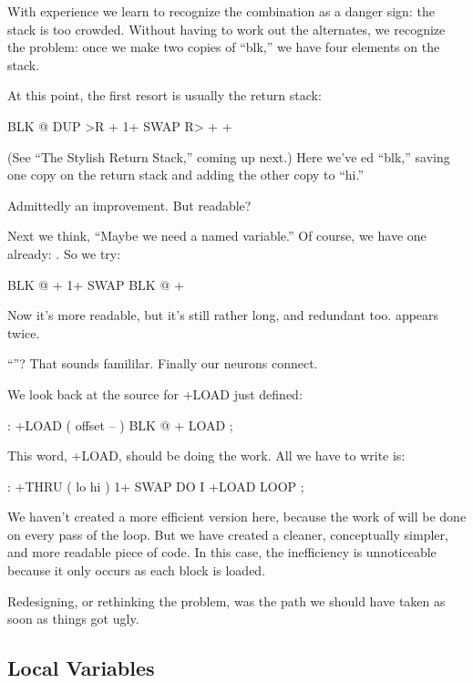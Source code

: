 With experience we learn to recognize the combination  as
a danger sign: the stack is too crowded. Without having to work out the
alternates, we recognize the problem: once we make two copies of ``blk,''
we have four elements on the stack.

At this point, the first resort is usually the return stack:

\begin{Code}
BLK @  DUP >R  + 1+  SWAP R> + +
\end{Code}
(See ``The Stylish Return Stack,'' coming up next.) Here we've ed
``blk,'' saving one copy on the return stack and adding the other copy to
``hi.''

Admittedly an improvement. But readable?

Next we think, ``Maybe we need a named variable.'' Of course, we
have one already: . So we try:

\begin{Code}
BLK @  + 1+  SWAP BLK @ +
\end{Code}
Now it's more readable, but it's still rather long, and redundant too.
 appears twice.

``''? That sounds famililar. Finally our neurons connect.

We look back at the source for +LOAD just defined:

\begin{Code}
: +LOAD  ( offset -- )  BLK @ +  LOAD ;
\end{Code}
This word, +LOAD, should be doing the work. All we have to write is:

\begin{Code}
: +THRU  ( lo hi )  1+ SWAP  DO  I +LOAD  LOOP ;
\end{Code}
We haven't created a more efficient version here, because the work of
 will be done on every pass of the loop. But we have created a
cleaner, conceptually simpler, and more readable piece of code. In this
case, the inefficiency is unnoticeable because it only occurs as each block
is loaded.

Redesigning, or rethinking the problem, was the path we should
have taken as soon as things got ugly.

\subsection{Local Variables}

